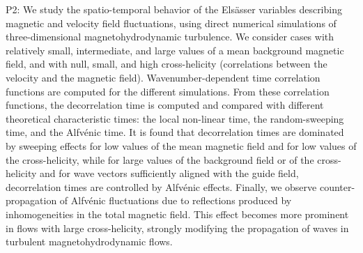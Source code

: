 P2:
We study the spatio-temporal behavior of the Els\"asser variables
describing magnetic and velocity field fluctuations, using direct
numerical simulations of three-dimensional magnetohydrodynamic
turbulence. We consider cases with relatively small, intermediate,
and large values of a mean background magnetic field, and with null,
small, and high cross-helicity (correlations between the velocity
and the magnetic field). Wavenumber-dependent time correlation
functions are computed for the different simulations. From these
correlation functions, the decorrelation time is computed and
compared with different theoretical characteristic times: the local
non-linear time, the random-sweeping time, and the Alfv\'enic
time. It is found that decorrelation times are dominated by sweeping
effects for low values of the mean magnetic field and for low values
of the cross-helicity, while for large values of the background
field or of the cross-helicity and for wave vectors sufficiently
aligned with the guide field, decorrelation times are controlled by
Alfv\'enic effects. Finally, we observe counter-propagation of
Alfv\'enic fluctuations due to reflections produced by
inhomogeneities in the total magnetic field. This effect becomes
more prominent in flows with large cross-helicity, strongly
modifying the propagation of waves in turbulent magnetohydrodynamic
flows.
